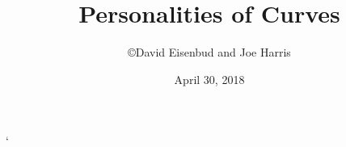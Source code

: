 
\ifx\whole\undefined

   
\let\see\relax
\usepackage{makeidx}
\makeindex

\overfullrule=5pt
\catcode`\@\active
{} %

\title{Personalities of Curves}
\author{\copyright David Eisenbud and Joe Harris}

\date{April 30, 2018}
%
%


\maketitle

\setcounter{page}{5}
\tableofcontents
\fi
